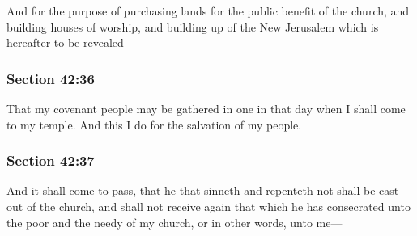 		And for the purpose of purchasing lands for the public benefit of the church, and building houses of worship, and building up of the New Jerusalem which is hereafter to be revealed---


	\subsubsection{Section 42:36} %
		\label{DC42-36}

		That my covenant people may be gathered in one in that day when I shall come to my temple.  And this I do for the salvation of my people.


	\subsubsection{Section 42:37} %
		\label{DC42-37}

		And it shall come to pass, that he that sinneth and repenteth not shall be cast out of the church, and shall not receive again that which he has consecrated unto the poor and the needy of my church, or in other words, unto me---


